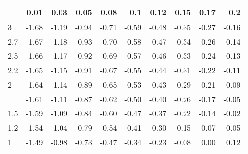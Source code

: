 
\begin{tabular}{lrrrrrrrrr}
\toprule
  & 0.01 & 0.03 & 0.05 & 0.08 & 0.1 & 0.12 & 0.15 & 0.17 & 0.2\\
\midrule
3 & -1.68 & -1.19 & -0.94 & -0.71 & -0.59 & -0.48 & -0.35 & -0.27 & -0.16\\
2.7 & -1.67 & -1.18 & -0.93 & -0.70 & -0.58 & -0.47 & -0.34 & -0.26 & -0.14\\
2.5 & -1.66 & -1.17 & -0.92 & -0.69 & -0.57 & -0.46 & -0.33 & -0.24 & -0.13\\
2.2 & -1.65 & -1.15 & -0.91 & -0.67 & -0.55 & -0.44 & -0.31 & -0.22 & -0.11\\
2 & -1.64 & -1.14 & -0.89 & -0.65 & -0.53 & -0.43 & -0.29 & -0.21 & -0.09\\
\addlinespace
1.7 & -1.61 & -1.11 & -0.87 & -0.62 & -0.50 & -0.40 & -0.26 & -0.17 & -0.05\\
1.5 & -1.59 & -1.09 & -0.84 & -0.60 & -0.47 & -0.37 & -0.22 & -0.14 & -0.02\\
1.2 & -1.54 & -1.04 & -0.79 & -0.54 & -0.41 & -0.30 & -0.15 & -0.07 & 0.05\\
1 & -1.49 & -0.98 & -0.73 & -0.47 & -0.34 & -0.23 & -0.08 & 0.00 & 0.12\\
\bottomrule
\end{tabular}
